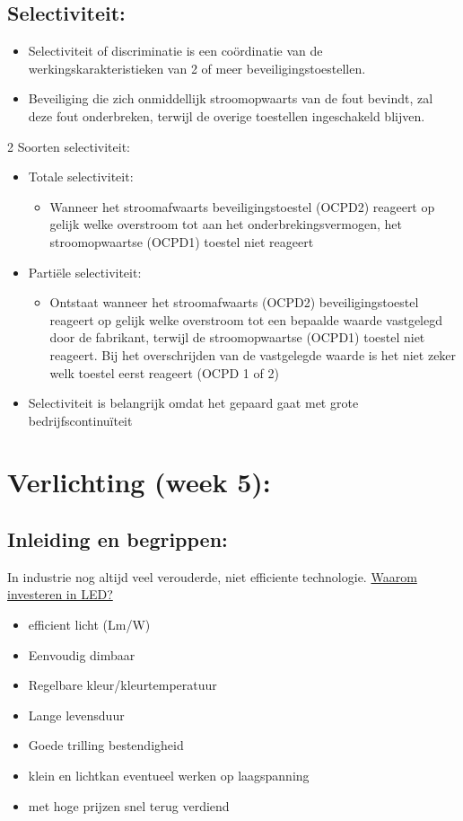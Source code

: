 \documentclass[12pt]{article}
\begin{document}
\subsection{Selectiviteit:}
\begin{itemize}
    \item Selectiviteit of discriminatie is een coördinatie van de werkingskarakteristieken van 2 of meer beveiligingstoestellen.
    \item Beveiliging die zich onmiddellijk stroomopwaarts van de fout bevindt, zal deze fout onderbreken, terwijl de overige toestellen
    ingeschakeld blijven.
\end{itemize}
2 Soorten selectiviteit:\begin{itemize}
    \item Totale selectiviteit:\begin{itemize}
        \item Wanneer het stroomafwaarts beveiligingstoestel (OCPD2) reageert op gelijk welke overstroom tot aan het onderbrekingsvermogen, het stroomopwaartse (OCPD1) toestel niet reageert
    \end{itemize}
    \item Partiële selectiviteit: \begin{itemize}
        \item Ontstaat wanneer het stroomafwaarts (OCPD2) beveiligingstoestel reageert op gelijk welke overstroom tot een bepaalde waarde vastgelegd door de fabrikant, terwijl de stroomopwaartse (OCPD1) toestel niet reageert. Bij het overschrijden van de vastgelegde waarde is het niet zeker welk toestel eerst reageert (OCPD 1 of 2)
    \end{itemize}
    \item Selectiviteit is belangrijk omdat het gepaard gaat met grote bedrijfscontinuïteit
\end{itemize}
\section{Verlichting (week 5):}
\subsection{Inleiding en begrippen:}
In industrie nog altijd veel verouderde, niet efficiente technologie.
\underline{Waarom investeren in LED?}
\begin{itemize}
    \item efficient licht (Lm/W)
    \item Eenvoudig dimbaar
    \item Regelbare kleur/kleurtemperatuur
    \item Lange levensduur
    \item Goede trilling bestendigheid
    \item klein en lichtkan eventueel werken op laagspanning
    \item met hoge prijzen snel terug verdiend
\end{itemize}
\end{document}
